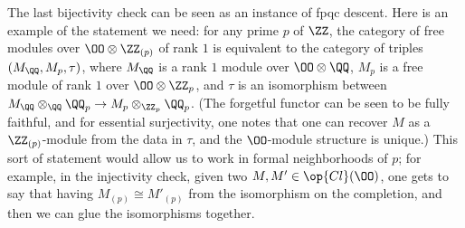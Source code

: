 \documentclass[../notes.tex]{subfiles}
\begin{document}
\begin{remark}
	The last bijectivity check can be seen as an instance of fpqc descent. Here is an example of the statement we need: for any prime $p$ of $\ZZ$, the category of free modules over $\OO\otimes\ZZ_{(p)}$ of rank $1$ is equivalent to the category of triples $(M_\QQ,M_p,\tau)$, where $M_\QQ$ is a rank $1$ module over $\OO\otimes\QQ$, $M_p$ is a free module of rank $1$ over $\OO\otimes\ZZ_p$, and $\tau$ is an isomorphism between $M_\QQ\otimes_\QQ\QQ_p\to M_p\otimes_{\ZZ_p}\QQ_p$. (The forgetful functor can be seen to be fully faithful, and for essential surjectivity, one notes that one can recover $M$ as a $\ZZ_{(p)}$-module from the data in $\tau$, and the $\OO$-module structure is unique.) This sort of statement would allow us to work in formal neighborhoods of $p$; for example, in the injectivity check, given two $M,M'\in\op{Cl}(\OO)$, one gets to say that having $M_{(p)}\cong M'_{(p)}$ from the isomorphism on the completion, and then we can glue the isomorphisms together.
\end{remark}
\end{document}
